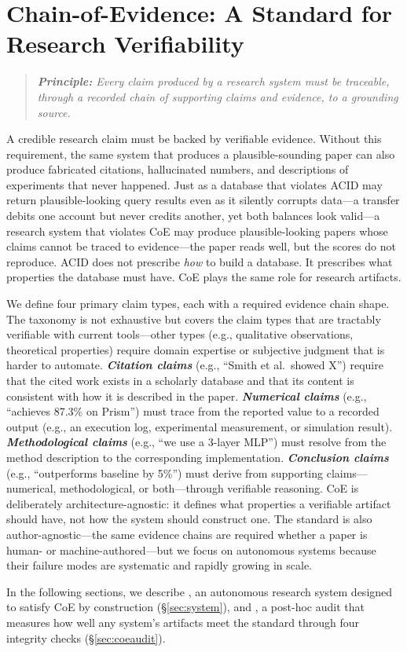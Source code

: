 \section{Chain-of-Evidence: A Standard for Research Verifiability}
\label{sec:coe}



\begin{quote}
\emph{\textbf{Principle:} Every claim produced by a research system must be traceable, through a recorded chain of supporting claims and evidence, to a grounding source.}
\end{quote}

\noindent A credible research claim must be backed by verifiable evidence.
Without this requirement, the same system that produces a plausible-sounding paper can also produce fabricated citations, hallucinated numbers, and descriptions of experiments that never happened.
Just as a database that violates ACID may return plausible-looking query results even as it silently corrupts data---a transfer debits one account but never credits another, yet both balances look valid---a research system that violates CoE may produce plausible-looking papers whose claims cannot be traced to evidence---the paper reads well, but the scores do not reproduce.
ACID does not prescribe \emph{how} to build a database. It prescribes what properties the database must have.
CoE plays the same role for research artifacts.


We define four primary claim types, each with a required evidence chain shape. The taxonomy is not exhaustive but covers the claim types that are tractably verifiable with current tools---other types (e.g., qualitative observations, theoretical properties) require domain expertise or subjective judgment that is harder to automate.
\textbf{\emph{Citation claims}} (e.g., ``Smith et al.\ showed X'') require that the cited work exists in a scholarly database and that its content is consistent with how it is described in the paper.
\textbf{\emph{Numerical claims}} (e.g., ``achieves 87.3\% on Prism'') must trace from the reported value to a recorded output (e.g., an execution log, experimental measurement, or simulation result).
\textbf{\emph{Methodological claims}} (e.g., ``we use a 3-layer MLP'') must resolve from the method description to the corresponding implementation.
\textbf{\emph{Conclusion claims}} (e.g., ``outperforms baseline by 5\%'') must derive from supporting claims---numerical, methodological, or both---through verifiable reasoning.
CoE is deliberately architecture-agnostic: it defines what properties a verifiable artifact should have, not how the system should construct one.
The standard is also author-agnostic---the same evidence chains are required whether a paper is human- or machine-authored---but we focus on autonomous systems because their failure modes are systematic and rapidly growing in scale.

In the following sections, we describe \sys{}, an autonomous research system designed to satisfy CoE by construction (\S\ref{sec:system}), and \coeaudit{}, a post-hoc audit that measures how well any system's artifacts meet the standard through four integrity checks (\S\ref{sec:coeaudit}).
